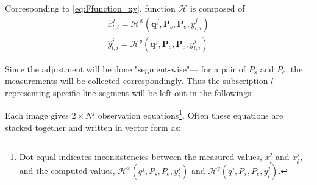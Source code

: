 Corresponding to \cref{eq:Ffunction_xy}, function $\mathcal{H}$ is composed of
\begin{equation}
\begin{split}
\hat{x}^j_{l,i} = \mathcal{H}^x(\mathbf{q}^j,\mathbf{P}_s,\mathbf{P}_e,y^j_{l,i})\\
\hat{y}^j_{l,i} = \mathcal{H}^y(\mathbf{q}^j,\mathbf{P}_s,\mathbf{P}_e,y^j_{l,i})
\end{split}
\end{equation}

Since the adjustment will be done "segment-wise"--- for a pair of $P_s$ and $P_e$, the measurements will be collected correspondingly. %
Thus the subscription $l$ representing specific line segment will be left out in the followings.

\clearpage
Each image gives $2\times N^j$ observation equations\footnote{Dot equal indicates inconsistencies between the measured values, $x^j_i$ and $x^j_i$, and the computed values, $\mathcal{H}^x(q^j,P_s,P_e,y^j_i)$ and $\mathcal{H}^y(q^j,P_s,P_e,y^j_i)$.}. Often these equations are stacked together and written in vector form as:
